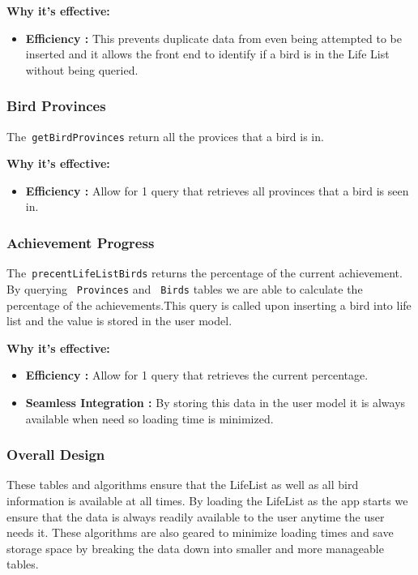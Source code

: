 \documentclass[a4paper]{article}
\begin{document}
\textbf{Why it's effective:}
\begin{itemize}
    \item \textbf{Efficiency :} This prevents duplicate data from even being attempted to be inserted and it allows the front end to identify if a bird is in the Life List without being queried.
\end{itemize}

\subsubsection{Bird Provinces}
The\texttt{\ getBirdProvinces} return all the provices that a bird is in.

\textbf{Why it's effective:}
\begin{itemize}
    \item \textbf{Efficiency :} Allow for 1 query that retrieves all provinces that a bird is seen in.
\end{itemize}

\subsubsection{Achievement Progress}
The\texttt{\ precentLifeListBirds} returns the percentage of the current achievement. By querying \texttt{\ Provinces} and \texttt{\ Birds} tables we are able to calculate the percentage of the achievements.This query is called upon inserting a bird into life list and the value is stored in the user model.

\textbf{Why it's effective:}
\begin{itemize}
    \item \textbf{Efficiency :} Allow for 1 query that retrieves the current percentage.
    \item  \textbf{Seamless Integration :} By storing this data in the user model it is always available when need so loading time is minimized.
\end{itemize}

\subsubsection{Overall Design}
These tables and algorithms ensure that the LifeList as well as all bird information is available at all times. By loading the LifeList as the app starts we ensure that the data is always readily available to the user anytime the user needs it. These algorithms are also geared to minimize loading times and save storage space by breaking the data down into smaller and more manageable tables. 
\end{document}
